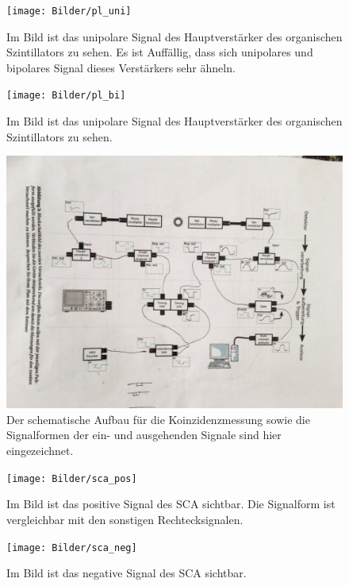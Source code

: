\begin{figure}[h]
	\centering
	\texttt{[image: Bilder/pl\_uni]}
	\caption[Unipolares Signal des Organischen Amp.]{\small Im Bild ist das unipolare Signal des Hauptverstärker des organischen Szintillators zu sehen. Es ist Auffällig, dass sich unipolares und bipolares Signal dieses Verstärkers sehr ähneln.}
	\label{uni_org}
\end{figure}
\begin{figure}[h]
	\centering
	\texttt{[image: Bilder/pl\_bi]}
	\caption[Bipolares Signal des Organischen Amp.]{\small Im Bild ist das unipolare Signal des Hauptverstärker des organischen Szintillators zu sehen. }
	\label{bip_org}
\end{figure}


\begin{figure}[h]
	\centering
	\includegraphics[scale=0.45,angle=90]{Bilder/schaltung_coinc}
	\caption[Schematischer Aufbau zur Koinzidenzmessung]{\small Der schematische Aufbau für die Koinzidenzmessung sowie die Signalformen der ein- und ausgehenden Signale sind hier eingezeichnet.}
	\label{schaltung_coinc}
\end{figure}

\begin{figure}[h]
	\centering
	\texttt{[image: Bilder/sca\_pos]}
	\caption[Positives Signal des SCA]{\small Im Bild ist das positive Signal des SCA sichtbar. Die Signalform ist vergleichbar mit den sonstigen Rechtecksignalen.}
	\label{SCA_pos}
\end{figure}

\begin{figure}[h]
	\centering
	\texttt{[image: Bilder/sca\_neg]}
	\caption[Negatives Signal des SCA]{\small Im Bild ist das negative Signal des SCA sichtbar.}
	\label{SCA_neg}
\end{figure}